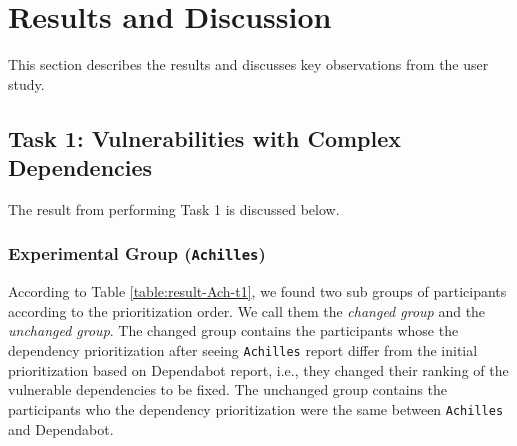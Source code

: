 \documentclass[conference]{IEEEtran}
\begin{document}
	
	
	\section{Results and Discussion}
	This section describes the results and discusses key observations from the user study.
	
	\subsection{Task 1: Vulnerabilities with Complex Dependencies}
	
	The result from performing Task 1 is discussed below.
	
	\subsubsection{Experimental Group (\texttt{Achilles})}
	According to Table \ref{table:result-Ach-t1}, we found two sub groups of participants according to the prioritization order. We call them the \textit{changed group} and the \textit{unchanged group}. The changed group contains the participants whose the dependency prioritization after seeing \texttt{Achilles} report differ from the  initial prioritization based on Dependabot report, i.e., they changed their ranking of the vulnerable dependencies to be fixed. The unchanged group contains the participants who the dependency prioritization were the same between \texttt{Achilles} and Dependabot.
	
\end{document}
